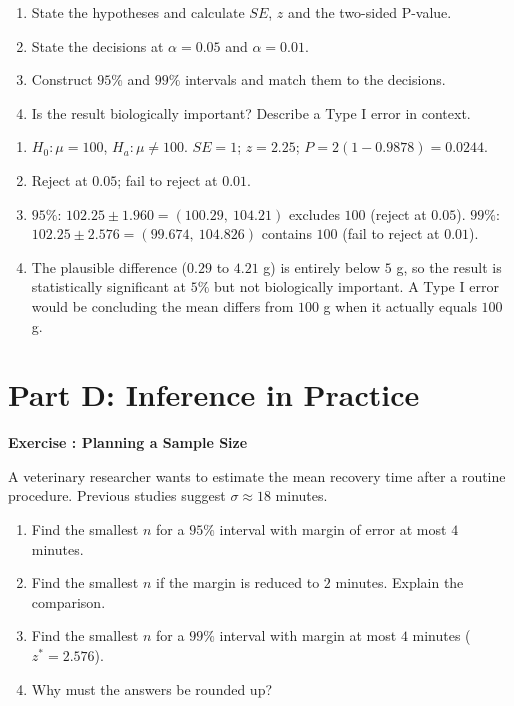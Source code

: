 \documentclass[11pt]{article}
\newcounter{exercise}
\newcommand{\exercise}[1]{%
  \par\medskip
  \refstepcounter{exercise}%
  {\large\bfseries\color{CourseBlue} Exercise \theexercise: #1}\par\smallskip}
\begin{document}
\begin{enumerate}
  \item State the hypotheses and calculate $SE$, $z$ and the two-sided P-value.
  \item State the decisions at $\alpha=0.05$ and $\alpha=0.01$.
  \item Construct $95\%$ and $99\%$ intervals and match them to the decisions.
  \item Is the result biologically important? Describe a Type I error in context.
\end{enumerate}

\begin{solution}
\begin{enumerate}
  \item $H_0:\mu=100$, $H_a:\mu\neq100$. $SE=1$; $z=2.25$; $P=2(1-0.9878)=0.0244$.
  \item Reject at $0.05$; fail to reject at $0.01$.
  \item $95\%$: $102.25\pm1.960=(100.29,\ 104.21)$ excludes $100$ (reject at $0.05$). $99\%$: $102.25\pm2.576=(99.674,\ 104.826)$ contains $100$ (fail to reject at $0.01$).
  \item The plausible difference ($0.29$ to $4.21$ g) is entirely below $5$ g, so the result is statistically significant at $5\%$ but not biologically important. A Type I error would be concluding the mean differs from $100$ g when it actually equals $100$ g.
\end{enumerate}
\end{solution}

\newpage
\section*{Part D: Inference in Practice}

\exercise{Planning a Sample Size}

A veterinary researcher wants to estimate the mean recovery time after a routine procedure. Previous studies suggest $\sigma\approx18$ minutes.

\begin{enumerate}
  \item Find the smallest $n$ for a $95\%$ interval with margin of error at most $4$ minutes.
  \item Find the smallest $n$ if the margin is reduced to $2$ minutes. Explain the comparison.
  \item Find the smallest $n$ for a $99\%$ interval with margin at most $4$ minutes ($z^*=2.576$).
  \item Why must the answers be rounded up?
\end{enumerate}
\end{document}
